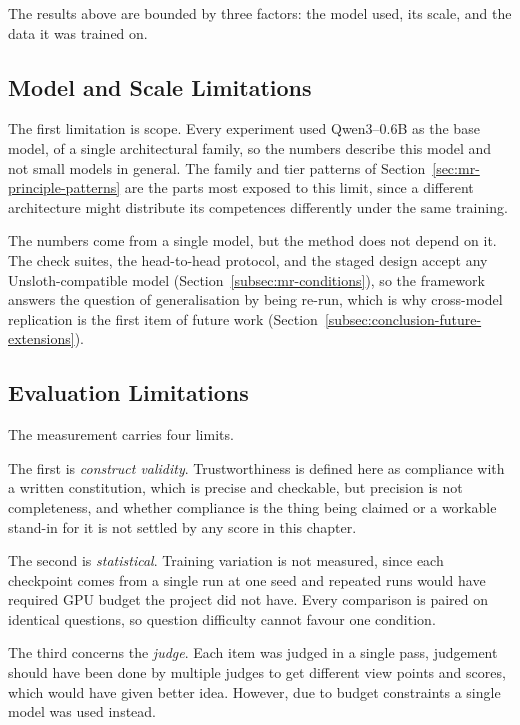 The results above are bounded by three factors: the model used, its scale, and the data it was trained on.

\subsection{Model and Scale Limitations}
\label{subsec:model-scale-limitations}

The first limitation is scope. Every experiment used Qwen3--0.6B as the base model, of a single architectural family, so the numbers describe this model and not small models in general. The family and tier patterns of Section~\ref{sec:mr-principle-patterns} are the parts most exposed to this limit, since a different architecture might distribute its competences differently under the same training.

The numbers come from a single model, but the method does not depend on it. The check suites, the head-to-head protocol, and the staged design accept any Unsloth-compatible model (Section~\ref{subsec:mr-conditions}), so the framework answers the question of generalisation by being re-run, which is why cross-model replication is the first item of future work (Section~\ref{subsec:conclusion-future-extensions}).

\subsection{Evaluation Limitations}
\label{subsec:evaluation-limitations}

The measurement carries four limits.

The first is \emph{construct validity}. Trustworthiness is defined here as compliance with a written constitution, which is precise and checkable, but precision is not completeness, and whether compliance is the thing being claimed or a workable stand-in for it is not settled by any score in this chapter.

The second is \emph{statistical}. Training variation is not measured, since each checkpoint comes from a single run at one seed and repeated runs would have required GPU budget the project did not have. Every comparison is paired on identical questions, so question difficulty cannot favour one condition.

The third concerns the \emph{judge}. Each item was judged in a single pass, judgement should have been done by multiple judges to get different view points and scores, which would have given better idea. However, due to budget constraints a single model was used instead. 

